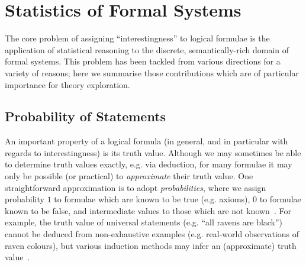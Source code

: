 \section{Statistics of Formal Systems}

\iffalse
TODO: Alison: I'd like to revisit this chapter once I see the whole
thesis. At the moment it feels in parts more like a discussion of your work,
than of related work. It might help to read other people's related work sections
to get a better idea of what to include here. I think it'll be more obvious too,
once we have the intro, etc. I suspect you'll need to do a fair bit more work on
this one.
\fi

The core problem of assigning ``interestingness'' to logical formulae is the
application of statistical reasoning to the discrete, semantically-rich domain
of formal systems. This problem has been tackled from various directions for a
variety of reasons; here we summarise those contributions which are of
particular importance for theory exploration.

\iffalse
\subsection{Clustering}
\label{sec:clustering}

\cite{journals/corr/abs-1212-3618}
\cite{heras2013proof}
\fi

\subsection{Probability of Statements}

An important property of a logical formula (in general, and in particular with
regards to interestingness) is its truth value. Although we may sometimes be
able to determine truth values exactly, e.g. via deduction, for many formulae it
may only be possible (or practical) to \emph{approximate} their truth value. One
straightforward approximation is to adopt \emph{probabilities}, where we assign
probability $1$ to formulae which are known to be true (e.g. axioms), $0$ to
formulae known to be false, and intermediate values to those which are not
known~\cite{Hutter.Lloyd.Ng.ea:2013}. For example, the truth value of universal
statements (e.g. ``all ravens are black'') cannot be deduced from non-exhaustive
examples (e.g. real-world observations of raven colours), but various induction
methods may infer an (approximate) truth value~\cite{10.1093/mind/LIV.214.97}.

